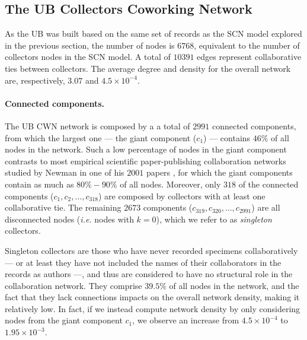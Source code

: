 
\subsection{The UB Collectors Coworking Network} \label{section:ub_cwn}

As the UB was built based on the same set of records as the SCN model explored in the previous section, the number of nodes is $6768$, equivalent to the number of collectors nodes in the SCN model.
A total of $10391$ edges represent collaborative ties between collectors.
The average degree and density for the overall network are, respectively, $3.07$ and $4.5 \times 10^{-4}$.

\paragraph*{Connected components.}
The UB CWN network is composed by a a total of $2991$ connected components, from which the largest one --- the giant component ($c_1$) ---  contains $46\%$ of all nodes in the network.
Such a low percentage of nodes in the giant component contrasts to most empirical scientific paper-publishing collaboration networks studied by Newman in one of his $2001$ papers \cite{Newman2001d}, for which the giant components contain as much as $80\% - 90\%$ of all nodes.
Moreover, only $318$ of the connected components ($c_1, c_2, ..., c_{318}$) are composed by collectors with at least one collaborative tie.
The remaining $2673$ components ($c_{319}, c_{320}, ..., c_{2991}$) are all disconnected nodes (\textit{i.e.} nodes with $k=0$), which we refer to as \textit{singleton} collectors.

Singleton collectors are those who have never recorded specimens collaboratively --- or at least they have not included the names of their collaborators in the records as authors ---, and thus are considered to have no structural role in the collaboration network.
They comprise $39.5\%$ of all nodes in the network, and the fact that they lack connections impacts on the overall network density, making it relatively low.
In fact, if we instead compute network density by only considering nodes from the giant component $c_1$, we observe an increase from $4.5 \times 10^{-4}$ to $1.95 \times 10^{-3}$. 

